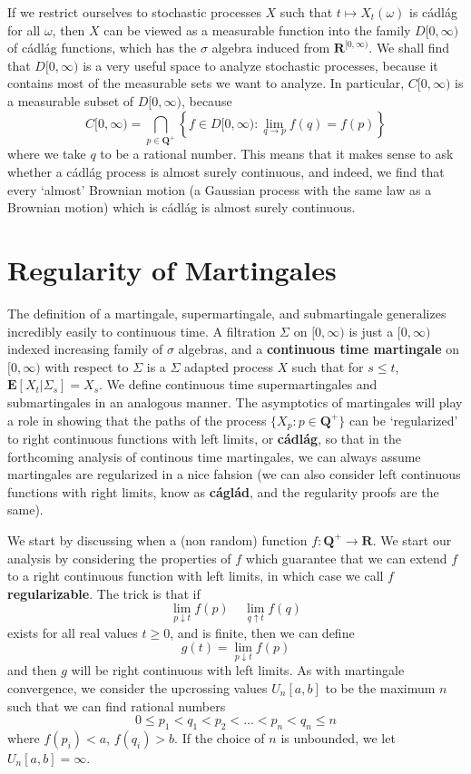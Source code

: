 If we restrict ourselves to stochastic processes $X$ such that $t \mapsto X_t(\omega)$ is c\'{a}dl\'{a}g for all $\omega$, then $X$ can be viewed as a measurable function into the family $D[0,\infty)$ of c\'{a}dl\'{a}g functions, which has the $\sigma$ algebra induced from $\mathbf{R}^{[0,\infty)}$. We shall find that $D[0,\infty)$ is a very useful space to analyze stochastic processes, because it contains most of the measurable sets we want to analyze. In particular, $C[0,\infty)$ is a measurable subset of $D[0,\infty)$, because
%
\[ C[0,\infty) = \bigcap_{p \in \mathbf{Q}^+} \left\{ f \in D[0,\infty): \lim_{q \to p} f(q) = f(p) \right\} \]
%
where we take $q$ to be a rational number. This means that it makes sense to ask whether a c\'{a}dl\'{a}g process is almost surely continuous, and indeed, we find that every `almost' Brownian motion (a Gaussian process with the same law as a Brownian motion) which is c\'{a}dl\'{a}g is almost surely continuous.

\section{Regularity of Martingales}

The definition of a martingale, supermartingale, and submartingale generalizes incredibly easily to continuous time. A filtration $\Sigma$ on $[0,\infty)$ is just a $[0,\infty)$ indexed increasing family of $\sigma$ algebras, and a {\bf continuous time martingale} on $[0,\infty)$ with respect to $\Sigma$ is a $\Sigma$ adapted process $X$ such that for $s \leq t$, $\mathbf{E}[X_t|\Sigma_s] = X_s$. We define continuous time supermartingales and submartingales in an analogous manner. The asymptotics of martingales will play a role in showing that the paths of the process $\{ X_p: p \in \mathbf{Q}^+ \}$ can be `regularized' to right continuous functions with left limits, or {\bf c\'{a}dl\'{a}g}, so that in the forthcoming analysis of continous time martingales, we can always assume martingales are regularized in a nice fahsion (we can also consider left continuous functions with right limits, know as {\bf c\'{a}gl\'{a}d}, and the regularity proofs are the same).

We start by discussing when a (non random) function $f: \mathbf{Q}^+ \to \mathbf{R}$. We start our analysis by considering the properties of $f$ which guarantee that we can extend $f$ to a right continuous function with left limits, in which case we call $f$ {\bf regularizable}. The trick is that if
%
\[ \lim_{p \downarrow t} f(p)\ \ \ \ \ \lim_{q \uparrow t} f(q) \]
%
exists for all real values $t \geq 0$, and is finite, then we can define
%
\[ g(t) = \lim_{p \downarrow t} f(p) \]
%
and then $g$ will be right continuous with left limits. As with martingale convergence, we consider the upcrossing values $U_n[a,b]$ to be the maximum $n$ such that we can find rational numbers
%
\[ 0 \leq p_1 < q_1 < p_2 < \dots < p_n < q_n \leq n \]
%
where $f(p_i) < a$, $f(q_i) > b$. If the choice of $n$ is unbounded, we let $U_n[a,b] = \infty$.

